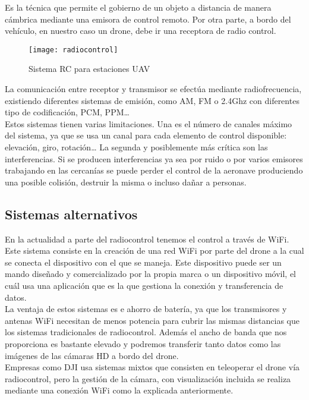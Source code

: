 Es la técnica que permite el gobierno de un objeto a distancia de manera cámbrica mediante una emisora de control remoto. Por otra parte, a bordo del vehículo, en nuestro caso un drone, debe ir una receptora de radio control. \\

\begin{figure}[htb]
\centering
\texttt{[image: radiocontrol]}
\caption{Sistema RC para estaciones UAV}
\label{fig:radiocontrol}
\end{figure}


La comunicación entre receptor y transmisor se efectúa mediante radiofrecuencia, existiendo diferentes sistemas de emisión, como AM, FM o 2.4Ghz con diferentes tipo de codificación, PCM, PPM…\\

Estos sistemas tienen varias limitaciones. Una es el número de canales máximo del sistema, ya que se usa un canal para cada elemento de control disponible: elevación, giro, rotación… La segunda y posiblemente más crítica son las interferencias. Si se producen interferencias ya sea por ruido o por varios emisores trabajando en las cercanías se puede perder el control de la aeronave produciendo una posible colisión, destruir la misma o incluso dañar a personas.\\
 
\subsection{Sistemas alternativos}

En la actualidad a parte del radiocontrol tenemos el control a través de WiFi. Este sistema consiste en la creación de una red WiFi por parte del drone a la cual se conecta el dispositivo con el que se maneja. Este dispositivo puede ser un mando diseñado y comercializado por la propia marca o un dispositivo móvil, el cuál usa una aplicación que es la que gestiona la conexión y transferencia de datos.\\

La ventaja de estos sistemas es e ahorro de batería, ya que los transmisores y antenas WiFi necesitan de menos potencia para cubrir las mismas distancias que los sistemas tradicionales de radiocontrol. Además el ancho de banda que nos proporciona es bastante elevado y podremos transferir tanto datos como las imágenes de las cámaras HD a bordo del drone.\\

Empresas como DJI usa sistemas mixtos que consisten en teleoperar el drone vía radiocontrol, pero la gestión de la cámara, con visualización incluida se realiza mediante una conexión WiFi como la explicada anteriormente.\\
 
